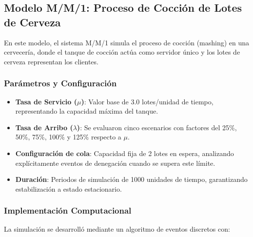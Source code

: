 \documentclass{article}
\begin{document}
\subsection{Modelo M/M/1: Proceso de Cocción de Lotes de Cerveza}


En este modelo, el sistema M/M/1 simula el proceso de cocción (mashing) en una cervecería, donde el tanque de cocción actúa como servidor único y los lotes de cerveza representan los clientes.


\subsubsection{Parámetros y Configuración}
\begin{itemize}
    \item \textbf{Tasa de Servicio ($\mu$)}: Valor base de 3.0 lotes/unidad de tiempo, representando la capacidad máxima del tanque.
   
    \item \textbf{Tasa de Arribo ($\lambda$)}: Se evaluaron cinco escenarios con factores del 25\%, 50\%, 75\%, 100\% y 125\% respecto a $\mu$.
   
    \item \textbf{Configuración de cola}: Capacidad fija de 2 lotes en espera, analizando explícitamente eventos de denegación cuando se supera este límite.
   
    \item \textbf{Duración}: Periodos de simulación de 1000 unidades de tiempo, garantizando estabilización a estado estacionario.
\end{itemize}


\subsubsection{Implementación Computacional}
La simulación se desarrolló mediante un algoritmo de eventos discretos con:
\end{document}
